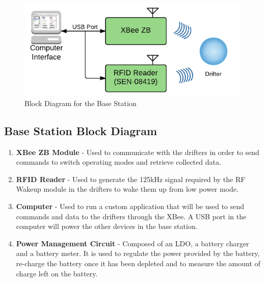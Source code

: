 \begin{figure}[ht]
	\centering
	\includegraphics[scale=1]{img/baseBlockDiagram}
	\caption{Block Diagram for the Base Station \label{fig:baseBlockDiagram}}
\end{figure}

\subsection{Base Station Block Diagram}

\begin{enumerate}
\item \textbf{XBee ZB Module} -  Used to communicate with the drifters in order to send commands to switch operating modes and retrieve collected data.

\item \textbf{RFID Reader} - Used to generate the 125kHz signal required by the RF Wakeup module in the drifters to wake them up from low power mode.

\item \textbf{Computer} - Used to run a custom application that will be used to send commands and data to the drifters through the XBee.  A USB port in the computer will power the other devices in the base station.

\item \textbf{Power Management Circuit} - Composed of an LDO, a battery charger and a battery meter.  It is used to regulate the power provided by the battery, re-charge the battery once it has been depleted and to measure the amount of charge left on the battery.


\end{enumerate}
